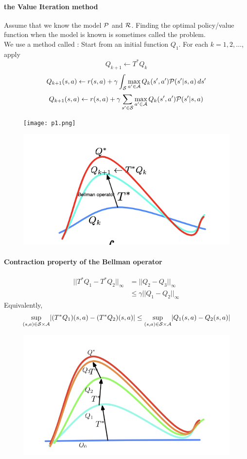 \documentclass[11pt]{article}
\begin{document}
\paragraph{the Value Iteration method}
Assume that we know the model $\mathcal{P}$ and $\mathcal{R}$. Finding the optimal policy/value function when the model is known is sometimes called the  problem.\\ 
We use a method called : Start from an initial function $Q_1$. For each $k = 1,2,\hdots$, apply
$$Q_{k+1} \leftarrow T^*Q_k$$
$$Q_{k+1}(s,a) \leftarrow r(s,a) + \gamma \int_{\mathcal{S}} \underset{a' \in \mathcal{A}}{\max}\,Q_k(s', a')\mathcal{P}(s'|s,a)\,ds'$$
$$Q_{k+1}(s,a) \leftarrow r(s,a) + \gamma \sum_{s' \in \mathcal{S}} \underset{a' \in \mathcal{A}}{\max}\,Q_k(s', a')\mathcal{P}(s'|s,a)$$
\begin{figure}[H]
	\centering
	\texttt{[image: p1.png]}
\end{figure}
\begin{figure}[H]
	\centering
	\includegraphics[scale=0.9]{p2.png}
\end{figure}

\paragraph{Contraction property of the Bellman operator}
\begin{align}
	||T^*Q_1 - T^*Q_2 ||_{\infty} &= ||Q_2 - Q_3 ||_{\infty}\\
	 &\leq \gamma||Q_1 - Q_2||_{\infty}
\end{align}
Equivalently,
$$\underset{(s,a)\in \mathcal{S} \times \mathcal{A}}{\sup} |(T^*Q_1)(s,a) - (T^*Q_2)(s,a)| \leq \underset{(s,a)\in \mathcal{S} \times \mathcal{A}}{\sup} |Q_1(s,a) - Q_2(s,a)|$$
\begin{figure}[H]
	\centering
	\includegraphics[scale=0.6]{p3.png}
\end{figure}
\end{document}
